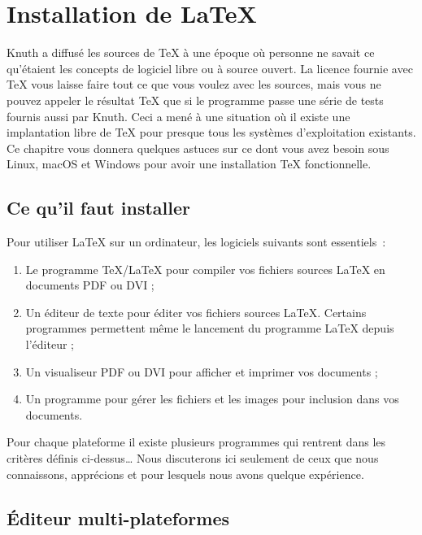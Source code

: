 \appendix
\chapter{Installation de \LaTeX}
\begin{intro}
Knuth a diffusé les sources de \TeX{} à une époque où personne ne
savait ce qu'étaient les concepts de logiciel libre ou à source
ouvert. La licence fournie avec \TeX{} vous laisse faire tout ce que
vous voulez avec les sources, mais vous ne pouvez appeler le résultat
\TeX{} que si le programme passe une série de tests fournis aussi par
Knuth. Ceci a mené à une situation où il existe une implantation libre
de \TeX{} pour presque tous les systèmes d'exploitation
existants. Ce chapitre vous donnera quelques astuces sur ce
dont vous avez besoin sous Linux,
macOS et Windows pour avoir une installation \TeX{} fonctionnelle.
\end{intro}

\section{Ce qu'il faut installer}

Pour utiliser \LaTeX{} sur un ordinateur, les logiciels suivants sont
essentiels~:

\begin{enumerate}

\item Le programme \TeX{}/\LaTeX{} pour compiler vos fichiers sources
  \LaTeX{} en documents PDF ou DVI ;

\item Un éditeur de texte pour éditer vos fichiers sources
  \LaTeX{}. Certains programmes permettent même le lancement du
  programme \LaTeX{} depuis l'éditeur ;

\item Un visualiseur PDF ou DVI pour afficher et imprimer vos documents ;

\item Un programme pour gérer les fichiers \PSi{} et les images
  pour inclusion dans vos documents.

\end{enumerate}

Pour chaque plateforme il existe plusieurs programmes qui rentrent dans les critères définis
ci-dessus\ldots{} Nous discuterons ici seulement de ceux que nous
connaissons, apprécions et pour lesquels nous avons quelque
expérience.

\section{Éditeur multi-plateformes}
\label{sec:texmaker}

